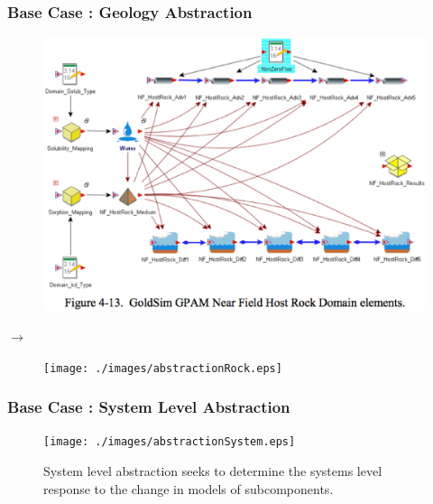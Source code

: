 \begin{frame}[ctb!]
  \frametitle{Base Case : Geology Abstraction}
  \begin{minipage}{0.45\textwidth}
    \begin{figure}[h!]
      \begin{center}
        \includegraphics[width=\textwidth]{./images/rock.eps}
      \end{center}
    \end{figure}
  \end{minipage}
  \hspace{0.01cm}\large{$\rightarrow$}\hspace{0.01cm}
  \begin{minipage}{0.45\textwidth}
    \begin{figure}[h!]
      \begin{center}
        \texttt{[image: ./images/abstractionRock.eps]}
      \end{center}
    \end{figure}
  \end{minipage}
\end{frame}

\begin{frame}[ctb!]
  \frametitle{Base Case : System Level Abstraction}
  \begin{figure}[h!]
      \texttt{[image: ./images/abstractionSystem.eps]}
    \caption{System level abstraction seeks to determine the systems level 
    response to the change in models of subcomponents.}
  \end{figure}
\end{frame}
